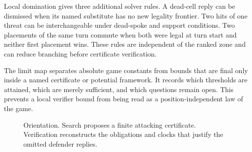 Local domination gives three additional solver rules.  A dead-cell reply can
be dismissed when its named substitute has no new legality frontier.  Two
hits of one threat can be interchangeable under dead-spoke and support
conditions.  Two placements of the same turn commute when both were legal at
turn start and neither first placement wins.  These rules are independent of
the ranked zone and can reduce branching before certificate verification.

The limit map separates absolute game constants from bounds that are final
only inside a named certificate or potential framework.  It records which
thresholds are attained, which are merely sufficient, and which questions
remain open.  This prevents a local verifier bound from being read as a
position-independent law of the game.

\begin{figure}[tbp]
  \centering
  \caption{Orientation.  Search proposes a finite attacking certificate.
  Verification reconstructs the obligations and clocks that justify the
  omitted defender replies.}
  \label{fig:orientation}
\end{figure}

